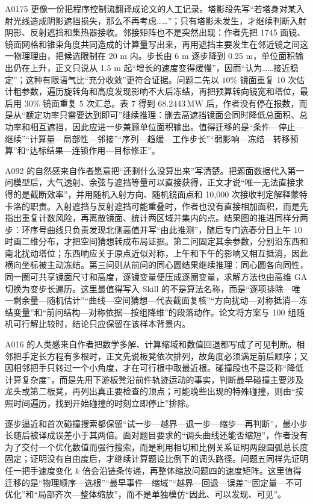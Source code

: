 A0175 更像一份把程序控制流翻译成论文的人工记录。塔影段先写“若塔身对某入射光线造成阴影遮挡损失，那么不再考虑……”；只有塔影未发生，才继续判断入射阴影、反射遮挡和集热器接收。邻接矩阵也不是突然出现：作者先把 1745 面镜、镜面网格和锥束角度共同造成的计算量写出来，再用遮挡主要发生在邻近镜之间这一物理理由，把候选限制在 20 m 内。步长由 6 m 逐步降到 0.25 m，单位面积输出仍在上升，正文只说从 1.5 m 起“增长的速度变得缓慢”，因而“认为……接近稳定”；这种有限语气比“充分收敛”更符合证据。问题二先以 $10\%$ 镜面重复 10 次估计粗参数，遍历旋转角和高度发现影响不大后冻结，再把预算转向镜宽和塔位，最后用 $30\%$ 镜面重复 5 次汇总。表 7 得到 $68.2443\,\mathrm{MW}$ 后，作者没有停在报数，而是从“额定功率只需要达到即可”继续推理：删去高遮挡镜面会同时降低总面积、总功率和相互遮挡，因此应进一步兼顾单位面积输出。值得迁移的是“条件—停止—继续”“计算量—局部性—邻接”“序列—趋缓—工作步长”“弱影响—冻结—转移预算”和“达标结果—连锁作用—目标修正”。

A092 的自然感来自作者愿意把“还剩什么没算出来”写清楚。把题面数据代入第一问模型后，大气透射、余弦与遮挡等量可以直接获得，正文才说“唯一无法直接求得的是截断效率”，并用随机入射方向、随机镜面点和 10,000 次接收判定解释蒙特卡洛的职责。入射遮挡与反射遮挡可能重叠时，作者也没有直接相加面积，而是先指出重复计数风险，再离散镜面、统计两区域并集内的点。结果图的推进同样分两步：环序号曲线只负责发现北侧高值并写“由此推测”，随后专门选春分日上午 10 时画二维分布，才把空间猜想转成布局证据。第二问固定其余参数，分别沿东西和南北扰动塔位；东西响应关于原点近似对称，上午和下午的影响又相互抵消，因此横向坐标被主动冻结。第三问则从前问的同心圆结果继续推理：同心圆各向同性，同一圈可共享镜面尺寸和高度，逐镜变量便压成逐圈变量，求解方法也由高维 GA 切换为变步长遍历。这里最值得写入 Skill 的不是算法名称，而是“逐项排除—唯一剩余量—随机估计”“曲线—空间猜想—代表截面复核”“方向扰动—对称抵消—冻结变量”和“前问结构—对称依据—按组降维”的段落动作。论文将方案与 100 组随机可行解比较时，结论只应保留在该样本背景内。

A016 的人类感来自作者把数学多解、计算缩域和数值回退都写成了可见判断。相邻把手定长方程有多根时，正文先说板凳依次排列，故角度必须满足前后顺序；又因相邻把手只转过一个小角度，才在可行根中取最近根。碰撞段也不是泛称“降低计算复杂度”，而是先用下游板凳沿前件轨迹运动的事实，判断最早碰撞主要涉及龙头或第二板凳，再列出真正要检查的顶点；可能晚些出现的特殊碰撞，则由“按照时间遍历，找到开始碰撞的时刻立即停止”排除。

逐步逼近和首次碰撞搜索都保留“试一步—越界—退一步—缩步—再判断”，最小步长随后被译成误差小于其两倍。面对题目要求的“调头曲线还能否缩短”，作者没有为了交付一个优化数值而强行搜索，而是利用相切和比例关系证明两段圆弧总长度固定；证明没有自由度后，才继续计算题设比例下的调头路径。问题五同样先证明任一把手速度变化 $k$ 倍会沿链条传递，再整体缩放问题四的速度矩阵。这里值得迁移的是“物理顺序—选根”“最早事件—缩域”“越界—回退—误差”“固定量—不可优化”和“局部齐次—整体缩放”，而不是单独模仿“因此、可以发现、可见”。

